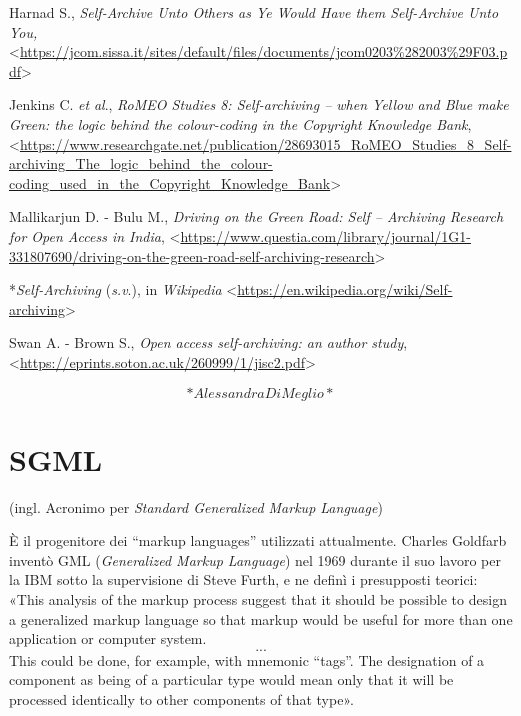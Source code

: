 \documentclass[
  b5paper,
  twoside,
  11pt,
  chapterprefix=false,
  bibliography=totocnumbered,
  listof=flat]{scrbook}
\begin{document}
Harnad S., \emph{Self-Archive Unto Others as Ye Would Have them Self-Archive
Unto You,}
\textless{}\href{https://jcom.sissa.it/sites/default/files/documents/jcom0203\%282003\%29F03.pdf}{{https://jcom.sissa.it/sites/default/files/documents/jcom0203\%282003\%29F03.pdf}}\textgreater{}

Jenkins C. \emph{et} \emph{al}., \emph{RoMEO Studies 8: Self-archiving -- when Yellow
and Blue make Green: the logic behind the colour-coding in the Copyright
Knowledge Bank},
\textless{}\href{https://www.researchgate.net/publication/28693015_RoMEO_Studies_8_Self-archiving_The_logic_behind_the_colour-coding_used_in_the_Copyright_Knowledge_Bank}{{https://www.researchgate.net/publication/28693015\_RoMEO\_Studies\_8\_Self-archiving\_The\_logic\_behind\_the\_colour-coding\_used\_in\_the\_Copyright\_Knowledge\_Bank}}\textgreater{}

Mallikarjun D. - Bulu M., \emph{Driving on the Green Road: Self -- Archiving
Research for Open Access in India},
\textless{}\href{https://www.questia.com/library/journal/1G1-331807690/driving-on-the-green-road-self-archiving-research}{{https://www.questia.com/library/journal/1G1-331807690/driving-on-the-green-road-self-archiving-research}}\textgreater{}

*\emph{Self-Archiving} (\emph{s.v}.), in \emph{Wikipedia}
\textless{}\href{https://en.wikipedia.org/wiki/Self-archiving}{{https://en.wikipedia.org/wiki/Self-archiving}}\textgreater{}

Swan A. - Brown S., \emph{Open access self-archiving: an author study},
\textless{}\href{https://eprints.soton.ac.uk/260999/1/jisc2.pdf}{{https://eprints.soton.ac.uk/260999/1/jisc2.pdf}}\textgreater{}

\[*Alessandra Di Meglio*\]

\hypertarget{sgml}{%
\chapter{SGML}\label{sgml}}

(ingl. Acronimo per \emph{Standard Generalized Markup Language})

È il progenitore dei \enquote{markup languages} utilizzati attualmente. Charles
Goldfarb inventò GML (\emph{Generalized Markup Language}) nel 1969 durante il
suo lavoro per la IBM sotto la supervisione di Steve Furth, e ne definì
i presupposti teorici: «This analysis of the markup process suggest that
it should be possible to design a generalized markup language so that
markup would be useful for more than one application or computer system.
\[...\] This could be done, for example, with mnemonic \enquote{tags}. The
designation of a component as being of a particular type would mean only
that it will be processed identically to other components of that type».
\end{document}
